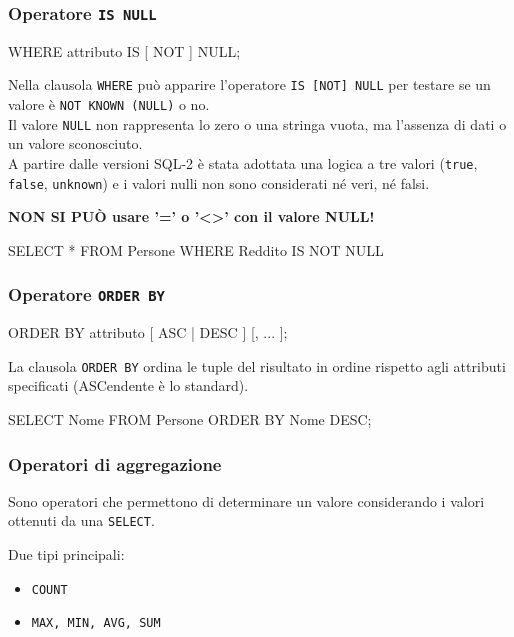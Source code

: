 \subsubsection{Operatore \texttt{IS NULL}}
\begin{codiceSQL}
WHERE attributo IS [ NOT ] NULL;
\end{codiceSQL}

Nella clausola \texttt{WHERE} può apparire l’operatore \texttt{IS [NOT] NULL} per testare se un valore è \texttt{NOT KNOWN (NULL)} o no.\\[0.2ex]
Il valore \texttt{NULL} non rappresenta lo zero o una stringa vuota, ma l'assenza di dati 
o un valore sconosciuto.\\[0.2ex]
A partire dalle versioni SQL-2 è stata adottata una logica a tre valori (\texttt{true},  \texttt{false}, \texttt{unknown}) e i valori nulli non sono considerati né veri, né falsi.
\begin{center}
\textbf{NON SI PUÒ usare ’=’ o ’<>’ con il valore NULL! } 
\end{center}

\begin{codiceSQL}
SELECT *
FROM Persone
WHERE Reddito IS NOT NULL
\end{codiceSQL}

\subsubsection{Operatore \texttt{ORDER BY}}
\begin{codiceSQL}
ORDER BY attributo [{ ASC | DESC }] [, ... ];
\end{codiceSQL}

La clausola \texttt{ORDER BY} ordina le tuple del risultato in ordine rispetto agli attributi  specificati (ASCendente è lo standard).
\begin{codiceSQL}
SELECT Nome
FROM Persone
ORDER BY Nome DESC;
\end{codiceSQL}

\subsubsection{Operatori di aggregazione}
Sono operatori che permettono di determinare un valore considerando i valori ottenuti da una \texttt{SELECT}.

\smallskip
Due tipi principali:
\begin{itemize}[label=$\triangleright$, itemsep=\smallskipamount]
  \item \texttt{COUNT}
  \item \texttt{MAX, MIN, AVG, SUM}
\end{itemize}

